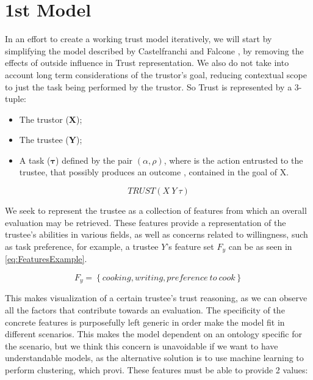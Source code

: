 \section{1st Model}
\label{sec:Model}

In an effort to create a working trust model iteratively, we will start by simplifying the model described by Castelfranchi and Falcone \cite{Castelfranchi1998}, by removing the effects of outside influence in Trust representation. We also do not take into account long term considerations of the trustor's goal, reducing contextual scope to just the task being performed by the trustor. So Trust is represented by a 3-tuple:

\begin{itemize}
	\item The trustor (\textbf{X});
	\item The trustee (\textbf{Y});
	\item A task ($\bm{\tau}$) defined by the pair $(\alpha, \rho)$, where \bm{$\alpha$} is the action entrusted to the trustee, that possibly produces an outcome \bm{$\rho$}, contained in the goal of X.
\end{itemize}
\begin{equation}
TRUST(X\ Y\ \tau)
\label{eq:TrustRelation}
\end{equation}

We seek to represent the trustee as a collection of features from which an overall evaluation may be retrieved. These features provide a representation of the trustee's abilities in various fields, as well as concerns related to willingness, such as task preference, for example, a trustee $Y$'s feature set $ F_y $ can be as seen in \ref{eq:FeaturesExample}.

\begin{equation}
F_y=\left\{cooking, writing, preference\ to\ cook\right\}
\label{eq:FeaturesExample}
\end{equation}

This makes visualization of a certain trustee's trust reasoning, as we can observe all the factors that contribute towards an evaluation. The specificity of the concrete features is purposefully left generic in order make the model fit in different scenarios. This makes the model dependent on an ontology specific for the scenario, but we think this concern is unavoidable if we want to have understandable models, as the alternative solution is to use machine learning to perform clustering, which provi. These features must be able to provide 2 values:

